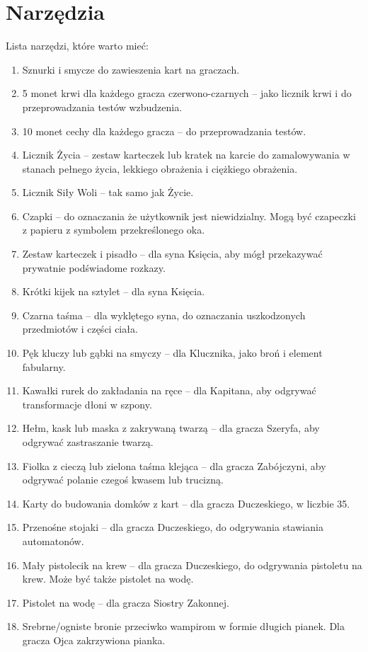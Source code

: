 \section{Narzędzia}
	Lista narzędzi, które warto mieć:
	\begin{enumerate}
		\item Sznurki i smycze do zawieszenia kart na graczach.
		\item 5 monet krwi dla każdego gracza czerwono-czarnych -- jako licznik krwi i do przeprowadzania testów wzbudzenia.
		\item 10 monet cechy dla każdego gracza -- do przeprowadzania testów.
		\item Licznik Życia -- zestaw karteczek lub kratek na karcie do zamalowywania w stanach pełnego życia, lekkiego obrażenia i ciężkiego obrażenia.
		\item Licznik Siły Woli -- tak samo jak Życie.
		\item Czapki -- do oznaczania że użytkownik jest niewidzialny. Mogą być czapeczki z papieru z symbolem przekreślonego oka.
		\item Zestaw karteczek i pisadło -- dla syna Księcia, aby mógł przekazywać prywatnie podświadome rozkazy.
		\item Krótki kijek na sztylet -- dla syna Księcia.
		\item Czarna taśma -- dla wyklętego syna, do oznaczania uszkodzonych przedmiotów i części ciała.
		\item Pęk kluczy lub gąbki na smyczy -- dla Klucznika, jako broń i element fabularny.
		\item Kawałki rurek do zakładania na ręce -- dla Kapitana, aby odgrywać transformacje dłoni w szpony.
		\item Hełm, kask lub maska z zakrywaną twarzą -- dla gracza Szeryfa, aby odgrywać zastraszanie twarzą.
		\item Fiolka z cieczą lub zielona taśma klejąca -- dla gracza Zabójczyni, aby odgrywać polanie czegoś kwasem lub trucizną.
		\item Karty do budowania domków z kart -- dla gracza Duczeskiego, w liczbie 35.
		\item Przenośne stojaki -- dla gracza Duczeskiego, do odgrywania stawiania automatonów.
		\item Mały pistolecik na krew -- dla gracza Duczeskiego, do odgrywania pistoletu na krew. Może być także pistolet na wodę.
		\item Pistolet na wodę -- dla gracza Siostry Zakonnej.
		\item Srebrne/ogniste bronie przeciwko wampirom w formie długich pianek. Dla gracza Ojca zakrzywiona pianka.

\end{enumerate}
